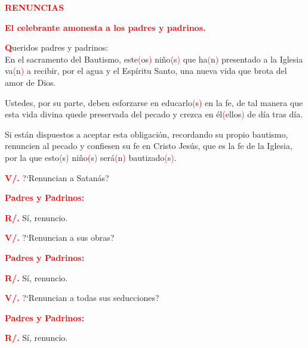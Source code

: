 \documentclass[12pt, letterpaper]{report}
\begin{document}
\Large {\bfseries \textcolor{red}{RENUNCIAS}}

\large {\bfseries \textcolor{red}{El celebrante amonesta a los padres y padrinos.}}

\lettrine[lines=1]{\bfseries \textcolor{red}{Q}}{}\Large ueridos padres y padrinos: \\ En el sacramento del Bautismo, este\textcolor{red}{(}os\textcolor{red}{)} ni\~no\textcolor{red}{(}s\textcolor{red}{)} que ha\textcolor{red}{(}n\textcolor{red}{)} presentado a la Iglesia va\textcolor{red}{(}n\textcolor{red}{)} a recibir, por el agua y el Esp\'iritu Santo, una nueva vida que brota del amor de Dios.

Ustedes, por su parte, deben esforzarse en educarlo\textcolor{red}{(}s\textcolor{red}{)} en la fe, de tal manera que esta vida divina quede preservada del pecado y crezca en \'el\textcolor{red}{(}ellos\textcolor{red}{)} de d\'ia tras d\'ia.

Si est\'an dispuestos a aceptar esta obligaci\'on, recordando su propio bautismo, renuncien al pecado y confiesen su fe en Cristo Jes\'us, que es la fe de la Iglesia, por la que esto\textcolor{red}{(}s\textcolor{red}{)} ni\~no\textcolor{red}{(}s\textcolor{red}{)} ser\'a\textcolor{red}{(}n\textcolor{red}{)} bautizado\textcolor{red}{(}s\textcolor{red}{)}.

\noindent
\Large {\bfseries \textcolor{red}{V/.}} \hspace{0.5cm} ?`Renuncian a Satan\'as?

\large {\bfseries \textcolor{red}{Padres y Padrinos:}}

\noindent
\Large {\bfseries \textcolor{red}{R/.}} \hspace{0.5cm} S\'i, renuncio. 

\noindent
\Large {\bfseries \textcolor{red}{V/.}} \hspace{0.5cm} ?`Renuncian a sus obras?

\large {\bfseries \textcolor{red}{Padres y Padrinos:}}

\noindent
\Large {\bfseries \textcolor{red}{R/.}} \hspace{0.5cm} S\'i, renuncio. 

\noindent
\Large {\bfseries \textcolor{red}{V/.}} \hspace{0.5cm} ?`Renuncian a todas sus seducciones?

\large {\bfseries \textcolor{red}{Padres y Padrinos:}}

\noindent
\Large {\bfseries \textcolor{red}{R/.}} \hspace{0.5cm} S\'i, renuncio. 
\end{document}
